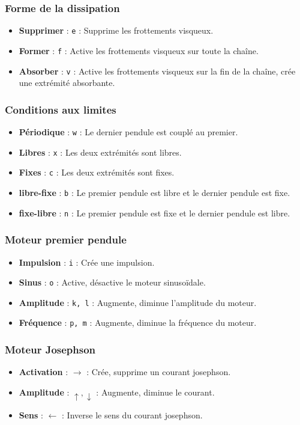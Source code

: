 \subsubsection{Forme de la dissipation}
%
\begin{itemize}[label=, leftmargin=2cm]
\item {\bf Supprimer} : \texttt{e} : Supprime les frottements visqueux.
\item {\bf Former} : \texttt{f} : Active les frottements visqueux sur toute la chaîne.
\item {\bf Absorber} : \texttt{v} : Active les frottements visqueux sur la fin de la chaîne, crée une extrémité absorbante.
\end{itemize}
%
\subsubsection{Conditions aux limites}
%
\begin{itemize}[label=, leftmargin=2cm]
\item {\bf Périodique} : \texttt{w} : Le dernier pendule est couplé au premier.
\item {\bf Libres} : \texttt{x} : Les deux extrémités sont libres.
\item {\bf Fixes} : \texttt{c} : Les deux extrémités sont fixes.
\item {\bf libre-fixe} : \texttt{b} : Le premier pendule est libre et le dernier pendule est fixe.
\item {\bf fixe-libre} : \texttt{n} : Le premier pendule est fixe et le dernier pendule est libre.
\end{itemize}
%
\subsubsection{Moteur premier pendule}
%
\begin{itemize}[label=, leftmargin=2cm]
\item {\bf Impulsion} : \texttt{i} : Crée une impulsion.
\item {\bf Sinus} : \texttt{o} : Active, désactive le moteur sinusoïdale.
\item {\bf Amplitude} : \texttt{k, l} :  Augmente, diminue l'amplitude du moteur.
\item {\bf Fréquence} : \texttt{p, m} :  Augmente, diminue la fréquence du moteur.
\end{itemize}
%
\subsubsection{Moteur Josephson}
%
\begin{itemize}[label=, leftmargin=2cm]
\item {\bf Activation} : \texttt{$\rightarrow$} : Crée, supprime un courant josephson.
\item {\bf Amplitude} : \texttt{$\uparrow, \downarrow$} : Augmente, diminue le courant.
\item {\bf Sens} : \texttt{$\leftarrow$} : Inverse le sens du courant josephson.
\end{itemize}
%
